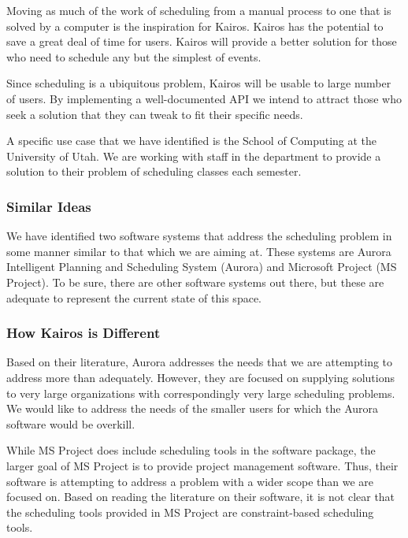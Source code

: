 \documentclass{extarticle}
\begin{document}
Moving as much of the work of scheduling from a manual process to one that is solved by a computer is the
inspiration for Kairos.  Kairos has the potential to save a great deal of time for users.  Kairos will provide a
better solution for those who need to schedule any but the simplest of events.

Since scheduling is a ubiquitous problem, Kairos will be usable to large number of users.  By implementing a
well-documented API we intend to attract those who seek a solution that they can tweak to fit their specific needs.

A specific use case that we have identified is the School of Computing at the University of Utah.  We are working
with staff in the department to provide a solution to their problem of scheduling classes each semester.

\subsubsection{Similar Ideas}
We have identified two software systems that address the scheduling problem in some manner similar to that which
we are aiming at.  These systems are Aurora Intelligent Planning and Scheduling System (Aurora) and Microsoft
Project (MS Project).  To be sure, there are other software systems out there, but these are adequate to represent
the current state of this space.

\subsubsection{How Kairos is Different}
Based on their literature, Aurora addresses the needs that we are attempting to address more than adequately.
However, they are focused on supplying solutions to very large organizations with correspondingly very large
scheduling problems.  We would like to address the needs of the smaller users for which the Aurora software would
be overkill.

While MS Project does include scheduling tools in the software package, the larger goal of MS Project is to provide
project management software.  Thus, their software is attempting to address a problem with a wider scope than we
are focused on.  Based on reading the literature on their software, it is not clear that the scheduling tools 
provided in MS Project are constraint-based scheduling tools.
\end{document}
